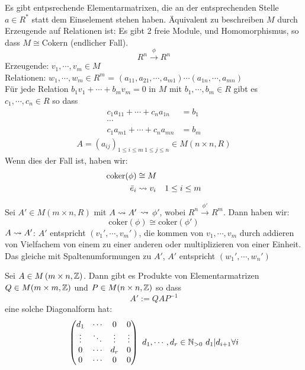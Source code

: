 \begin{Bem}
  Es gibt entpsrechende Elementarmatrixen, die an der entsprechenden Stelle $a\in R^*$ statt dem Einselement stehen haben. Äquivalent zu beschreiben $M$ durch Erzeugende auf Relationen ist: Es gibt 2 freie Module, und Homomorphismus, so dass $M\cong$Cokern (endlicher Fall).
  \[R^n\xrightarrow{\phi}R^n\]
  Erzeugende: $v_1,\cdots,v_m\in M$\\
  Relationen: $w_1,\cdots,w_m\in R^m$ = $\left( a_{11},a_{21},\cdots,a_{m1} \right)\cdots\left( a_{1n},\cdots,a_{mn} \right)$\\
  Für jede Relation $b_1v_1+\cdots+b_mv_m=0$ in $M$ mit $b_1,\cdots,b_m\in R$ gibt es $c_1,\cdots,c_n\in R$ so dass
  \begin{align*}
    c_1a_{11}+\cdots+c_na_{1n}&=b_1\\
    \cdots\\
    c_1a_{m1}+\cdots+c_na_{mn}&=b_m
  \end{align*}
  \begin{align*}
    A=(a_{ij})_{1\leq i\leq m\ 1\leq j\leq n}\in M(n\times n,R)
  \end{align*}
  Wenn dies der Fall ist, haben wir:
  \begin{align*}
    \text{coker}(\phi)&\cong M\\
    \bar e_i&\rightsquigarrow v_i&1\leq i\leq m
  \end{align*}
\end{Bem}
\begin{Bem}
  Sei $A'\in M(m\times n,R)$ mit $A\rightsquigarrow A'$ $\rightsquigarrow$ $\phi'$, wobei $R^n\xrightarrow{\phi'}R^m$. Dann haben wir:
  \[\text{coker}(\phi)\cong\text{coker}(\phi')\]
  $A\rightsquigarrow A'$: $A'$ entspricht $\left( v_1',\cdots,v_m' \right)$, die kommen von $v_1,\cdots,v_m$ durch addieren von Vielfachem von einem zu einer anderen oder multiplizieren von einer Einheit. Das gleiche mit Spaltenumformungen zu $A'$, $A'$ entspricht $(w_1',\cdots,w_n')$
\end{Bem}
\begin{Prop}
  Sei $A\in M\left( m\times n,\mathbb{Z} \right)$. Dann gibt es Produkte von Elementarmatrizen $Q\in M(m\times m,\mathbb{Z})$ und $P\in M(n\times n,\mathbb{Z})$ so dass
  \[A':=QAP^{-1}\]
  eine solche Diagonalform hat:
  \[\Mx{d_1&\cdots&0&0\\\vdots&\ddots&\vdots&\vdots\\0&\cdots&d_r&0\\0&\cdots&0&0}\ d_1,\cdots,d_r\in\mb{N}_{>0}\  d_1|d_{i+1}\forall i\]
\end{Prop}
